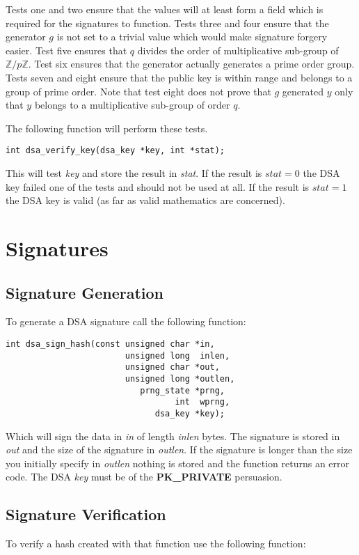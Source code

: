 \documentclass[synpaper]{book}
\def\Z{{\mathbb Z}}
\newcommand{\mysection}[1]    %
	{                   %
	\section{#1}
   \markboth{\textsf{www.libtom.net}}{\thesection ~ {#1}}
	}
\begin{document}
Tests one and two ensure that the values will at least form a field which is required for the signatures to
function.  Tests three and four ensure that the generator $g$ is not set to a trivial value which would make signature
forgery easier.  Test five ensures that $q$ divides the order of multiplicative sub-group of $\Z/p\Z$. Test six
ensures that the generator actually generates a prime order group.  Tests seven and eight ensure that the public key
is within range and belongs to a group of prime order.  Note that test eight does not prove that $g$ generated $y$ only
that $y$ belongs to a multiplicative sub-group of order $q$.

The following function will perform these tests.

\begin{verbatim}
int dsa_verify_key(dsa_key *key, int *stat);
\end{verbatim}

This will test \textit{key} and store the result in \textit{stat}.  If the result is $stat = 0$ the DSA key failed one of the tests
and should not be used at all.  If the result is $stat = 1$ the DSA key is valid (as far as valid mathematics are concerned).

\mysection{Signatures}
\subsection{Signature Generation}
To generate a DSA signature call the following function:

\begin{verbatim}
int dsa_sign_hash(const unsigned char *in,
                        unsigned long  inlen,
                        unsigned char *out,
                        unsigned long *outlen,
                           prng_state *prng,
                                  int  wprng,
                              dsa_key *key);
\end{verbatim}

Which will sign the data in \textit{in} of length \textit{inlen} bytes.  The signature is stored in \textit{out} and the size
of the signature in \textit{outlen}.  If the signature is longer than the size you initially specify in \textit{outlen} nothing
is stored and the function returns an error code.  The DSA \textit{key} must be of the \textbf{PK\_PRIVATE} persuasion.

\subsection{Signature Verification}
To verify a hash created with that function use the following function:
\end{document}
